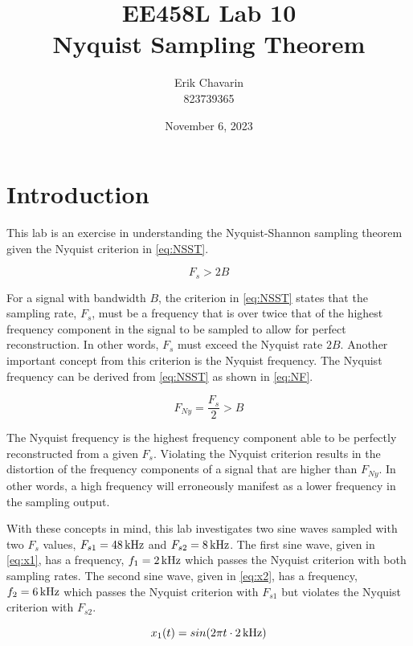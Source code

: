 \documentclass[a4paper,12pt]{article}
\title{%
  EE458L Lab 10 \\
  \large Nyquist Sampling Theorem
  }
\newcommand{\Hz}[1]{%
    \ifcase#1
        \relax
    \or
        \,\text{Hz}
    \or
        \,\text{kHz}
    \or
        \,\text{MHz}
    \or
        \,\text{GHz}
    \else
        \,\text{Invalid}
    \fi
}
\begin{document}
\author{Erik Chavarin \\ 823739365}
\date{November 6, 2023}

\maketitle
\section*{Introduction}
This lab is an exercise in understanding the Nyquist-Shannon sampling theorem given the Nyquist criterion in \cref{eq:NSST}.

\begin{equation}
    F_s > 2B
    \label{eq:NSST}
\end{equation} 

For a signal with bandwidth $B$, the criterion in \cref{eq:NSST} states that the sampling rate, $F_s$, must be a frequency that is over twice that of the highest frequency component in the signal to be sampled to allow for perfect reconstruction. In other words, $F_s$ must exceed the Nyquist rate $2B$. Another important concept from this criterion is the Nyquist frequency. The Nyquist frequency can be derived from \cref{eq:NSST} as shown in \cref{eq:NF}.

\begin{equation}
    F_{Ny} = \frac{F_s}{2} > B
    \label{eq:NF}
\end{equation} 

The Nyquist frequency is the highest frequency component able to be perfectly reconstructed from a given $F_s$. Violating the Nyquist criterion results in the distortion of the frequency components of a signal that are higher than $F_{Ny}$. In other words, a high frequency will erroneously manifest as a lower frequency in the sampling output.

With these concepts in mind, this lab investigates two sine waves sampled with two $F_s$ values, $F_{s1} = 48\Hz{2}$ and $F_{s2} = 8\Hz{2}$. The first sine wave, given in \cref{eq:x1}, has a frequency, $f_1 = 2\Hz{2}$ which passes the Nyquist criterion with both sampling rates. The second sine wave, given in \cref{eq:x2}, has a frequency, $f_2 = 6\Hz{2}$ which passes the Nyquist criterion with $F_{s1}$ but violates the Nyquist criterion with $F_{s2}$. 

\begin{equation}
    x_1(t) = sin(2 \pi t \cdot 2\Hz{2}) 
    \label{eq:x1}
\end{equation}
\end{document}
